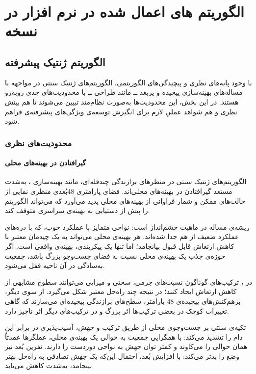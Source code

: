 \chapter{الگوریتم های اعمال شده در نرم افزار 
در نسخه 
\softwareVersion}

\section{الگوریتم ژنتیک پیشرفته}

با وجود پايه‌های نظری و پيچيدگی‌های الگوريتمی، الگوريتم‌های ژنتيک سنتی در مواجهه با مساله‌های بهينه‌سازی پيچيده و پربعد ــ مانند طراحی  ــ با محدوديت‌های جدی روبه‌رو هستند. در اين بخش، اين محدوديت‌ها به‌صورت نظام‌مند تبيين می‌شوند تا هم بينش نظری و هم شواهد عملیِ لازم برای انگيزش توسعه‌ی ويژگی‌های پيشرفته‌ی  فراهم شود.

\subsection{محدوديت‌های نظری}

\subsubsection{گيرافتادن در بهينه‌های محلی}

الگوريتم‌های ژنتيک سنتی در منظر‌های برازندگی چندقله‌ای، مانند بهينه‌سازی ، به‌شدت مستعد گيرافتادن در بهينه‌های محلی‌اند. فضای پارامتری 48بُعدی منظری نمايی از حالت‌های ممکن و شمار فراوانی از بهينه‌های محلی پديد می‌آورد که می‌تواند الگوريتم را پيش از دستيابی به بهينه‌ی سراسری متوقف کند.

ريشه‌ی مساله در ماهيت چشم‌انداز  است: نواحی متمايز با عملکرد خوب، که با دره‌های عملکرد ضعيف از هم جدا شده‌اند. هر بهينه‌ی محلی می‌تواند به يک چيدمان معتبر  با کاهش ارتعاش قابل قبول بيانجامد؛ اما تنها يک پيكربندی، بهينه‌ی واقعی است. اگر حوزه‌ی جذب يک بهينه‌ی محلی نسبت به فضای جست‌وجو بزرگ باشد، جمعيت به‌سادگی در آن ناحيه قفل می‌شود.

در ، ترکيب‌های گوناگون نسبت‌های جرمی، سختی و ميرايی می‌توانند سطوح مشابهی از کاهش ارتعاش ايجاد کنند؛ در نتيجه چند راه‌حل معتبر شکل می‌گيرد. از سوی ديگر، برهم‌کنش‌های پيچيده‌ی 48 پارامتر، سطح‌های برازندگی پيچيده‌ای می‌سازند که گاهی تغييرات کوچک در بعضی ترکيب‌ها اثر بزرگ و در ترکيب‌های ديگر اثر ناچيز دارد.

تکيه‌ی  سنتی بر جست‌وجوی محلی از طريق ترکيب و جهش، آسيب‌پذيری در برابر اين دام را تشديد می‌کند: با همگرايی جمعيت به حوالی يک بهينه‌ی محلی، عملگرها عمدتاً همان حوالی را می‌کاوند و کمتر توان جهش به نواحی دوردست را دارند. نفرين بُعد نيز وضع را بدتر می‌کند: با افزايش بُعد، احتمال اين‌که يک جهش تصادفی به راه‌حل بهتر بينجامد، به‌شدت کاهش می‌يابد.

